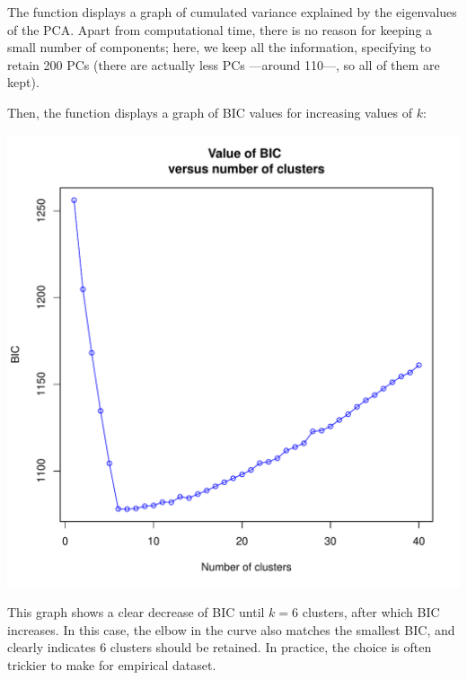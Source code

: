 \documentclass{article}
\begin{document}
\noindent
The function displays a graph of cumulated variance explained by the eigenvalues of the PCA.
Apart from computational time, there is no reason for keeping a small number of components; here, we
keep all the information, specifying to retain 200 PCs (there are actually less PCs ---around 110---, so all of them
are kept).

Then, the function displays a graph of BIC values for increasing values of $k$:
\begin{center}
  \includegraphics[width=.7\textwidth]{figs/findclust-bic.pdf}
\end{center}

\noindent This graph shows a clear decrease of BIC until $k=6$ clusters, after which BIC increases.
In this case, the elbow in the curve also matches the smallest BIC, and clearly indicates 6 clusters
should be retained. In practice, the choice is often trickier to make for empirical dataset.
\\
\end{document}
